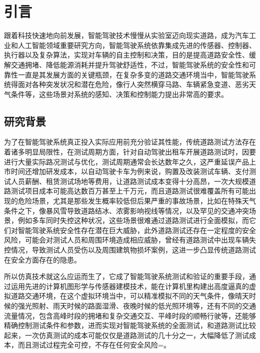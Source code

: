 \chapter{引言}

跟着科技快速地向前发展，智能驾驶技术慢慢从实验室迈向现实道路，成为汽车工业和人工智能领域重要研究方向，智能驾驶系统依靠集成先进的传感器、控制器、执行器以及复杂算法，实现对车辆的自主控制和决策，目的是提高道路安全性、缓解交通拥堵、降低能源消耗并提升驾驶舒适性，不过，智能驾驶系统的安全性和可靠性一直是其发展方面的关键瓶颈，在复杂多变的道路交通环境当中，智能驾驶系统得面对各种突发状况和潜在危险，像行人突然横穿马路、车辆紧急变道、恶劣天气条件等，这些场景对系统的感知、决策和控制能力提出非常高的要求。

\section{研究背景}


为了在智能驾驶系统真正投入实际应用前充分验证其性能，传统道路测试方法存在着诸多明显局限性，在测试周期方面，针对自动驾驶出租车开展道路测试时，因要进行大量实际路况测试与优化，测试周期通常会长达数年之久，这严重延误产品上市时间还增加研发成本，以自动驾驶卡车为例来说，购置及改装测试车辆、支付测试人员薪酬、租赁测试场地等费用，让道路测试成本变得十分高昂，一次大规模道路测试项目成本可能高达数百万甚至上千万元，而且道路测试很难覆盖所有可能出现的危险场景，尤其是那些发生概率较低但后果严重的事故场景，比如在特殊天气条件之下，像暴风雪导致道路结冰、浓雾影响视线等情况，以及罕见的交通冲突场景，例如多车同时失控这种状况，这些场景很难通过道路测试进行全面模拟，而它们对智能驾驶系统安全性存在潜在巨大威胁，此外道路测试还存在一定程度的安全风险，可能会对测试人员和周围环境造成相应威胁，曾经有道路测试中出现车辆失控情况，导致测试人员受伤以及周围建筑物损坏案例，这进一步凸显传统道路测试在安全方面存在的隐患。

所以仿真技术就这么应运而生了，它成了智能驾驶系统测试和验证的重要手段，通过运用先进的计算机图形学与传感器建模技术，能在计算机里构建出高度逼真的虚拟道路交通环境，在这个虚拟环境当中，可以精准模拟不同的天气条件，像晴天时候的强光照射、雨天时候的路面湿滑、夜晚时候的低光照环境等，还有不同的交通流量情况，包含高峰时段的拥堵和复杂交通交互、平峰时段的顺畅行驶等，还能够精确控制测试条件和参数，\cite{dingus2006100}进而实现对智能驾驶系统的全面测试，和道路测试比较起来，一次仿真测试的成本可能仅仅是道路测试的几十分之一，大幅降低了测试成本，而且测试过程完全可控，不存在任何安全风险=。

